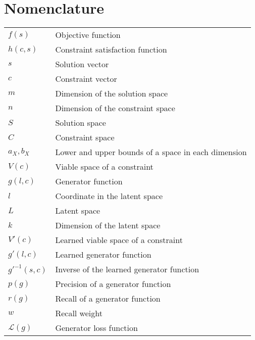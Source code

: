 \documentclass[../main.tex]{subfiles}
\begin{document}
\chapter*{Nomenclature}

\begin{tabular}{ l l }
    $f(s)$ & Objective function \\ 
    $h(c, s)$ & Constraint satisfaction function \\  
    $s$ & Solution vector \\
    $c$ & Constraint vector \\
    $m$ & Dimension of the solution space \\
    $n$ & Dimension of the constraint space \\
    $S$ & Solution space \\
    $C$ & Constraint space \\
    $a_X, b_X$ & Lower and upper bounds of a space in each dimension \\
    $V(c)$ & Viable space of a constraint \\
    $g(l, c)$ & Generator function \\
    $l$ & Coordinate in the latent space \\
    $L$ & Latent space \\
    $k$ & Dimension of the latent space \\
    $V'(c)$ & Learned viable space of a constraint \\
    $g'(l, c)$ & Learned generator function \\
    $g'^{-1}(s, c)$ & Inverse of the learned generator function \\
    $p(g)$ & Precision of a generator function \\
    $r(g)$ & Recall of a generator function \\
    $w$ & Recall weight \\
    $\mathcal{L}(g)$ & Generator loss function \\
\end{tabular}
\end{document}
